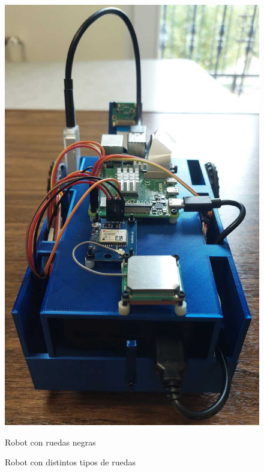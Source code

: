 \begin{figure}[ht!]
\begin{minipage}{0.30\linewidth}
		\includegraphics[width=\linewidth]{figs/cap5/ab.jpeg}
		\caption*{\centering Robot con ruedas negras}
	\end{minipage}
	\caption{Robot con distintos tipos de ruedas}
	\label{fig:robot}
\end{figure}



